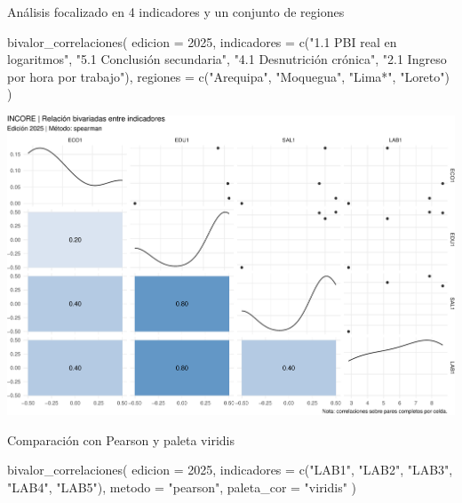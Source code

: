 \documentclass[
  11pt,
  letterpaper,
  DIV=11,
  numbers=noendperiod]{scrartcl}
\newenvironment{Shaded}{\begin{snugshade}}{\end{snugshade}}
\newcommand{\AttributeTok}[1]{\textcolor[rgb]{0.40,0.45,0.13}{#1}}
\newcommand{\DecValTok}[1]{\textcolor[rgb]{0.68,0.00,0.00}{#1}}
\newcommand{\FunctionTok}[1]{\textcolor[rgb]{0.28,0.35,0.67}{#1}}
\newcommand{\NormalTok}[1]{\textcolor[rgb]{0.00,0.23,0.31}{#1}}
\newcommand{\StringTok}[1]{\textcolor[rgb]{0.13,0.47,0.30}{#1}}
\begin{document}
Análisis focalizado en 4 indicadores y un conjunto de regiones

\begin{Shaded}
\begin{Highlighting}[]
\FunctionTok{bivalor\_correlaciones}\NormalTok{(}
  \AttributeTok{edicion =} \DecValTok{2025}\NormalTok{,}
  \AttributeTok{indicadores =} \FunctionTok{c}\NormalTok{(}\StringTok{"1.1 PBI real en logaritmos"}\NormalTok{, }\StringTok{"5.1 Conclusión secundaria"}\NormalTok{,}
                  \StringTok{"4.1 Desnutrición crónica"}\NormalTok{, }\StringTok{"2.1 Ingreso por hora por trabajo"}\NormalTok{),}
  \AttributeTok{regiones =} \FunctionTok{c}\NormalTok{(}\StringTok{"Arequipa"}\NormalTok{, }\StringTok{"Moquegua"}\NormalTok{, }\StringTok{"Lima*"}\NormalTok{, }\StringTok{"Loreto"}\NormalTok{)}
\NormalTok{)}
\end{Highlighting}
\end{Shaded}

\includegraphics{Manual_files/figure-pdf/unnamed-chunk-114-1.pdf}

Comparación con Pearson y paleta viridis

\begin{Shaded}
\begin{Highlighting}[]
\FunctionTok{bivalor\_correlaciones}\NormalTok{(}
  \AttributeTok{edicion =} \DecValTok{2025}\NormalTok{,}
  \AttributeTok{indicadores =} \FunctionTok{c}\NormalTok{(}\StringTok{"LAB1"}\NormalTok{, }\StringTok{"LAB2"}\NormalTok{, }\StringTok{"LAB3"}\NormalTok{, }\StringTok{"LAB4"}\NormalTok{, }\StringTok{"LAB5"}\NormalTok{),}
  \AttributeTok{metodo =} \StringTok{"pearson"}\NormalTok{,}
  \AttributeTok{paleta\_cor =} \StringTok{"viridis"}
\NormalTok{)}
\end{Highlighting}
\end{Shaded}
\end{document}
